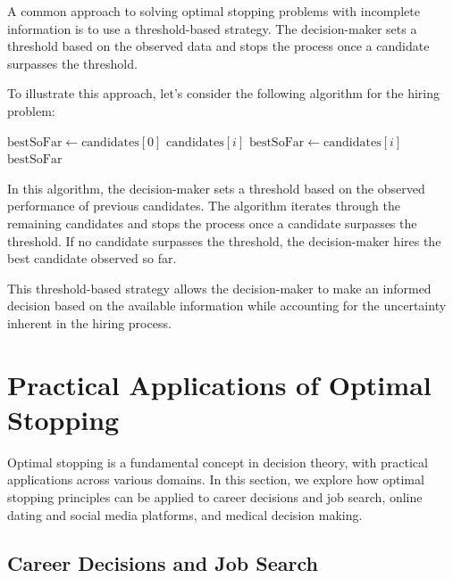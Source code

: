 \documentclass[12pt]{book} %
\begin{document}
A common approach to solving optimal stopping problems with incomplete information is to use a threshold-based strategy. The decision-maker sets a threshold based on the observed data and stops the process once a candidate surpasses the threshold.

To illustrate this approach, let's consider the following algorithm for the hiring problem:
\FloatBarrier
\begin{algorithm}
\caption{Optimal Stopping with Incomplete Information}\label{incomplete_info}
\begin{algorithmic}[1]
\State $\text{bestSoFar} \gets \text{candidates}[0]$
        \State \Return $\text{candidates}[i]$
    \EndIf
        \State $\text{bestSoFar} \gets \text{candidates}[i]$
    \EndIf
\EndFor
\State \Return $\text{bestSoFar}$
\EndFunction
\end{algorithmic}
\end{algorithm}
\FloatBarrier
In this algorithm, the decision-maker sets a threshold based on the observed performance of previous candidates. The algorithm iterates through the remaining candidates and stops the process once a candidate surpasses the threshold. If no candidate surpasses the threshold, the decision-maker hires the best candidate observed so far.

This threshold-based strategy allows the decision-maker to make an informed decision based on the available information while accounting for the uncertainty inherent in the hiring process.


\section{Practical Applications of Optimal Stopping}

Optimal stopping is a fundamental concept in decision theory, with practical applications across various domains. In this section, we explore how optimal stopping principles can be applied to career decisions and job search, online dating and social media platforms, and medical decision making.

\subsection{Career Decisions and Job Search}
\end{document}
